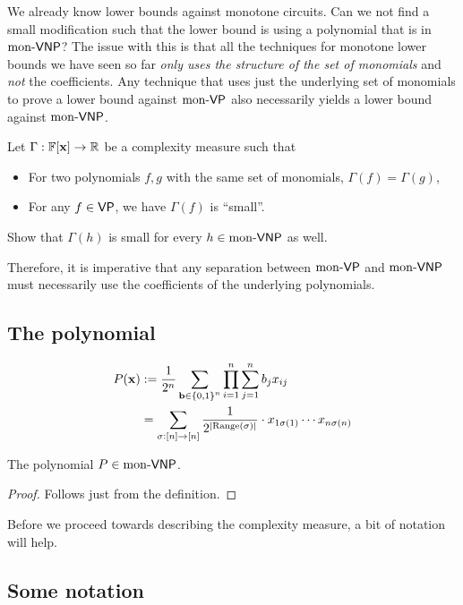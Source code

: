 We already know lower bounds against monotone circuits. Can we not find a small modification such that the lower bound is using a polynomial that is in $\mathrm{mon}\text{-}\mathsf{VNP}$? The issue with this is that all the techniques for monotone lower bounds we have seen so far \emph{only uses the structure of the set of monomials} and \emph{not} the coefficients. Any technique that uses just the underlying set of monomials to prove a lower bound against $\mathrm{mon}\text{-}\mathsf{VP}$ also necessarily yields a lower bound against $\mathrm{mon}\text{-}\mathsf{VNP}$.

\begin{exercise}
  Let $\Gamma:\mathbb{F}[\mathbf{x}] \rightarrow \mathbb{R}$ be a complexity measure such that
  \begin{itemize}
  \item For two polynomials $f,g$ with the same set of monomials, $\Gamma(f) = \Gamma(g)$,
  \item For any $f \in \mathsf{VP}$, we have $\Gamma(f)$ is ``small''.
  \end{itemize}
  Show that $\Gamma(h)$ is small for every $h \in \mathrm{mon}\text{-}\mathsf{VNP}$ as well.
\end{exercise}

Therefore, it is imperative that any separation between $\mathrm{mon}\text{-}\mathsf{VP}$ and $\mathrm{mon}\text{-}\mathsf{VNP}$ must necessarily use the coefficients of the underlying polynomials.

\subsection*{The polynomial}

\begin{align*}
  P(\mathbf{x}) & := \frac{1}{2^n} \sum_{\mathbf{b} \in \left\{0,1\right\}^n} \prod_{i=1}^n \sum_{j=1}^n b_j x_{ij}\\
           & = \sum_{\sigma: [n] \rightarrow [n]} \frac{1}{2^{\left|\operatorname{Range}(\sigma)\right|}} \cdot x_{1\sigma(1)} \cdots x_{n\sigma(n)}
\end{align*}

\begin{lemma}
  The polynomial $P \in \mathrm{mon}\text{-}\mathsf{VNP}$.
\end{lemma}
\begin{proof}
  Follows just from the definition.
\end{proof}

Before we proceed towards describing the complexity measure, a bit of notation will help.

\subsection*{Some notation}

